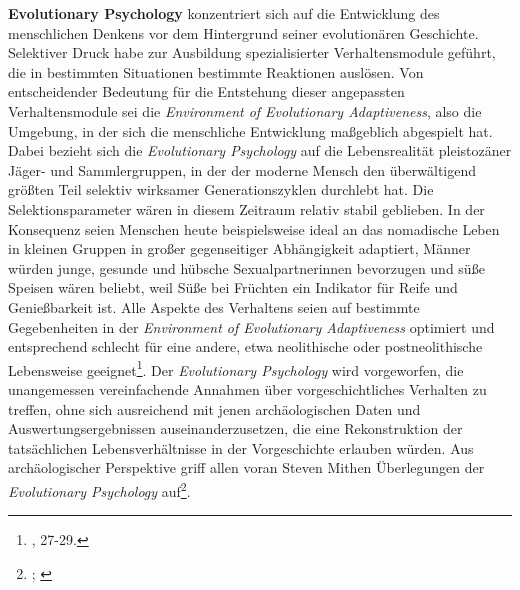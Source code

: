 \documentclass[openany,twoside,twocolumn]{book}
\let\rmarkdownfootnote\footnote%
\def\footnote{\protect\rmarkdownfootnote}
\begin{document}
\textbf{Evolutionary Psychology} konzentriert sich auf die Entwicklung
des menschlichen Denkens vor dem Hintergrund seiner evolutionären
Geschichte. Selektiver Druck habe zur Ausbildung spezialisierter
Verhaltensmodule geführt, die in bestimmten Situationen bestimmte
Reaktionen auslösen. Von entscheidender Bedeutung für die Entstehung
dieser angepassten Verhaltensmodule sei die \emph{Environment of
Evolutionary Adaptiveness}, also die Umgebung, in der sich die
menschliche Entwicklung maßgeblich abgespielt hat. Dabei bezieht sich
die \emph{Evolutionary Psychology} auf die Lebensrealität pleistozäner
Jäger- und Sammlergruppen, in der der moderne Mensch den überwältigend
größten Teil selektiv wirksamer Generationszyklen durchlebt hat. Die
Selektionsparameter wären in diesem Zeitraum relativ stabil geblieben.
In der Konsequenz seien Menschen heute beispielsweise ideal an das
nomadische Leben in kleinen Gruppen in großer gegenseitiger Abhängigkeit
adaptiert, Männer würden junge, gesunde und hübsche Sexualpartnerinnen
bevorzugen und süße Speisen wären beliebt, weil Süße bei Früchten ein
Indikator für Reife und Genießbarkeit ist. Alle Aspekte des Verhaltens
seien auf bestimmte Gegebenheiten in der \emph{Environment of
Evolutionary Adaptiveness} optimiert und entsprechend schlecht für eine
andere, etwa neolithische oder postneolithische Lebensweise
geeignet\footnote{\textcite{SmithThreestylesevolutionary2000}, 27-29.}.
Der \emph{Evolutionary Psychology} wird vorgeworfen, die unangemessen
vereinfachende Annahmen über vorgeschichtliches Verhalten zu treffen,
ohne sich ausreichend mit jenen archäologischen Daten und
Auswertungsergebnissen auseinanderzusetzen, die eine Rekonstruktion der
tatsächlichen Lebensverhältnisse in der Vorgeschichte erlauben würden.
Aus archäologischer Perspektive griff allen voran Steven Mithen
Überlegungen der \emph{Evolutionary Psychology} auf\footnote{\textcite{Mithenprehistorymindsearch1996};
  \textcite{mithen_cognitive_1997}}.
\end{document}
